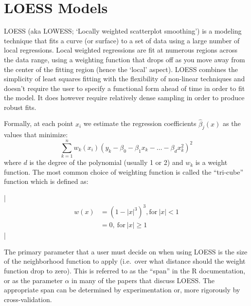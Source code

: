 
\section{LOESS Models}

LOESS (aka LOWESS; `Locally weighted scatterplot smoothing') is a
modeling technique that fits a curve (or surface) to a set of data using
a large number of local regressions. Local weighted regressions are fit
at numerous regions across the data range, using a weighting function
that drops off as you move away from the center of the fitting region
(hence the `local' aspect). LOESS combines the simplicity of least
squares fitting with the flexibility of non-linear techniques and
doesn't require the user to specify a functional form ahead of time in
order to fit the model. It does however require relatively dense
sampling in order to produce robust fits.

Formally, at each point $x_i$ we estimate the regression coefficients
$\hat{\beta}_j(x)$ as the values that minimize:
\[\sum_{k=1}^n w_k(x_i)(y_k - \beta_0 - \beta_1 x_k - \ldots - \beta_d x_k^2)^2\]
where $d$ is the degree of the polynomial (usually 1 or 2) and $w_k$ is
a weight function. The most common choice of weighting function is
called the ``tri-cube'' function which is defined as:

\lstDeleteShortInline|
\begin{align*}
 w(x) & = (1-|x|^3)^3, \mbox{for}\ |x| < 1  \\
      & = 0,\ \mbox{for}\ |x| \geq 1
\end{align*}
\lstMakeShortInline|



The primary parameter that a user must decide on when using LOESS is the
size of the neighborhood function to apply (i.e.~over what distance
should the weight function drop to zero). This is referred to as the
``span'' in the R documentation, or as the parameter $\alpha$ in many of
the papers that discuss LOESS. The appropriate span can be determined by
experimentation or, more rigorously by cross-validation.

